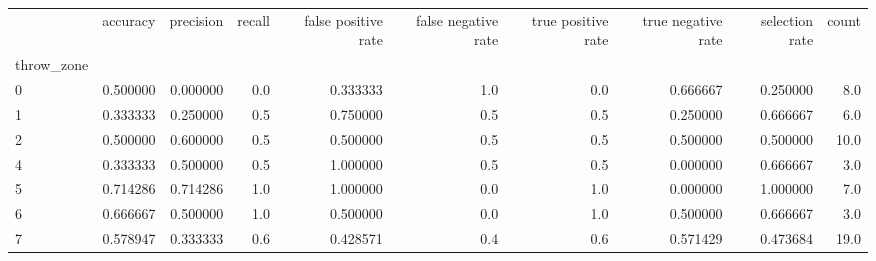 \begin{tabular}{lrrrrrrrrr}
\toprule
{} &  accuracy &  precision &  recall &  false positive rate &  false negative rate &  true positive rate &  true negative rate &  selection rate &  count \\
throw\_zone &           &            &         &                      &                      &                     &                     &                 &        \\
\midrule
0          &  0.500000 &   0.000000 &     0.0 &             0.333333 &                  1.0 &                 0.0 &            0.666667 &        0.250000 &    8.0 \\
1          &  0.333333 &   0.250000 &     0.5 &             0.750000 &                  0.5 &                 0.5 &            0.250000 &        0.666667 &    6.0 \\
2          &  0.500000 &   0.600000 &     0.5 &             0.500000 &                  0.5 &                 0.5 &            0.500000 &        0.500000 &   10.0 \\
4          &  0.333333 &   0.500000 &     0.5 &             1.000000 &                  0.5 &                 0.5 &            0.000000 &        0.666667 &    3.0 \\
5          &  0.714286 &   0.714286 &     1.0 &             1.000000 &                  0.0 &                 1.0 &            0.000000 &        1.000000 &    7.0 \\
6          &  0.666667 &   0.500000 &     1.0 &             0.500000 &                  0.0 &                 1.0 &            0.500000 &        0.666667 &    3.0 \\
7          &  0.578947 &   0.333333 &     0.6 &             0.428571 &                  0.4 &                 0.6 &            0.571429 &        0.473684 &   19.0 \\
\bottomrule
\end{tabular}
